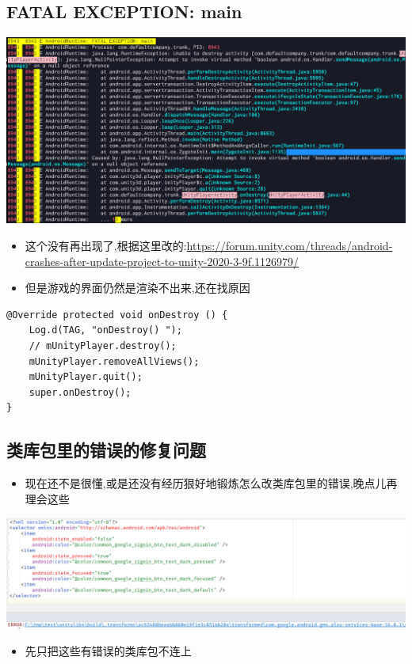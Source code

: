 \documentclass[9pt, b5paper]{article}
\begin{document}
\subsection{FATAL EXCEPTION: main}
\label{sec-10-1}

\includegraphics[width=.9\linewidth]{./pic/unityToAndroid_20221124_101807.png}
\begin{itemize}
\item 这个没有再出现了,根据这里改的:\url{https://forum.unity.com/threads/android-crashes-after-update-project-to-unity-2020-3-9f.1126979/}
\item 但是游戏的界面仍然是渲染不出来,还在找原因
\end{itemize}
\begin{verbatim}
@Override protected void onDestroy () {
    Log.d(TAG, "onDestroy() ");
    // mUnityPlayer.destroy();
    mUnityPlayer.removeAllViews();
    mUnityPlayer.quit();
    super.onDestroy();
}
\end{verbatim}
\subsection{类库包里的错误的修复问题}
\label{sec-10-2}
\begin{itemize}
\item 现在还不是很懂,或是还没有经历狠好地锻炼怎么改类库包里的错误,晚点儿再理会这些
\end{itemize}

\includegraphics[width=.9\linewidth]{./pic/unityToAndroid_20221124_163004.png}
\begin{itemize}
\item 先只把这些有错误的类库包不连上
\end{itemize}
\end{document}
